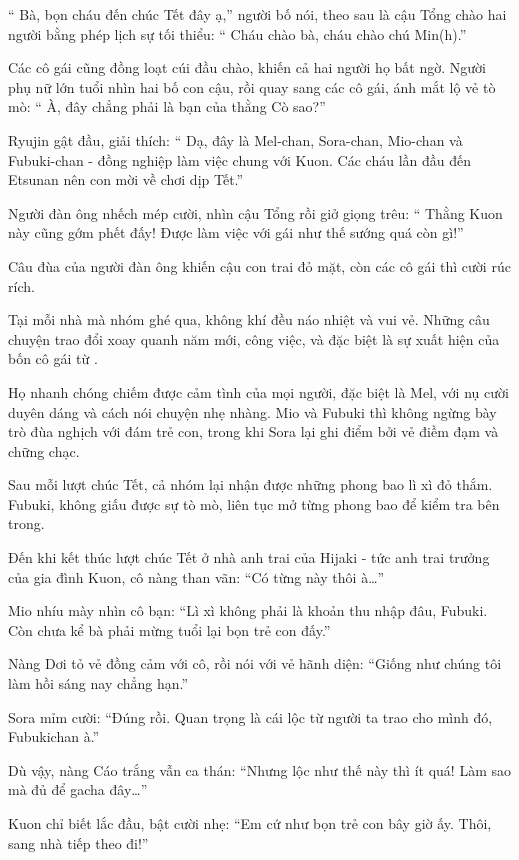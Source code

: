 \documentclass[../main.tex]{subfiles}
\begin{document}
``{\color{red} Bà, bọn cháu đến chúc Tết đây ạ,}'' người bố nói, theo sau là cậu Tổng chào hai người bằng phép lịch sự tối thiểu: ``{\color{red} Cháu chào bà, cháu chào chú Min(h).}''

Các cô gái cũng đồng loạt cúi đầu chào, khiến cả hai người họ bất ngờ. Người phụ nữ lớn tuổi nhìn hai bố con cậu, rồi quay sang các cô gái, ánh mắt lộ vẻ tò mò: ``{\color{red} À, đây chẳng phải là bạn của thằng Cò sao?}''

Ryujin gật đầu, giải thích: ``{\color{red} Dạ, đây là Mel-chan, Sora-chan, Mio-chan và Fubuki-chan - đồng nghiệp làm việc chung với Kuon. Các cháu lần đầu đến Etsunan nên con mời về chơi dịp Tết.}''

Người đàn ông nhếch mép cười, nhìn cậu Tổng rồi giở giọng trêu: ``{\color{red} Thằng Kuon này cũng gớm phết đấy! Được làm việc với gái như thế sướng quá còn gì!}''

Câu đùa của người đàn ông khiến cậu con trai đỏ mặt, còn các cô gái thì cười rúc rích.

\ct

Tại mỗi nhà mà nhóm ghé qua, không khí đều náo nhiệt và vui vẻ. Những câu chuyện trao đổi xoay quanh năm mới, công việc, và đặc biệt là sự xuất hiện của bốn cô gái từ \hll.

Họ nhanh chóng chiếm được cảm tình của mọi người, đặc biệt là Mel, với nụ cười duyên dáng và cách nói chuyện nhẹ nhàng. Mio và Fubuki thì không ngừng bày trò đùa nghịch với đám trẻ con, trong khi Sora lại ghi điểm bởi vẻ điềm đạm và chững chạc.

Sau mỗi lượt chúc Tết, cả nhóm lại nhận được những phong bao lì xì đỏ thắm. Fubuki, không giấu được sự tò mò, liên tục mở từng phong bao để kiểm tra bên trong.

Đến khi kết thúc lượt chúc Tết ở nhà anh trai của Hijaki - tức anh trai trưởng của gia đình Kuon, cô nàng than vãn: ``Có từng này thôi à\dots''

Mio nhíu mày nhìn cô bạn: ``Lì xì không phải là khoản thu nhập đâu, Fubuki. Còn chưa kể bà phải mừng tuổi lại bọn trẻ con đấy.''

Nàng Dơi tỏ vẻ đồng cảm với cô, rồi nói với vẻ hãnh diện: ``Giống như chúng tôi làm hồi sáng nay chẳng hạn.''

Sora mỉm cười: ``Đúng rồi. Quan trọng là cái lộc từ người ta trao cho mình đó, Fubukichan à.''

Dù vậy, nàng Cáo trắng vẫn ca thán: ``Nhưng lộc như thế này thì ít quá! Làm sao mà đủ để gacha đây\dots''

Kuon chỉ biết lắc đầu, bật cười nhẹ: ``Em cứ như bọn trẻ con bây giờ ấy. Thôi, sang nhà tiếp theo đi!''
\end{document}
